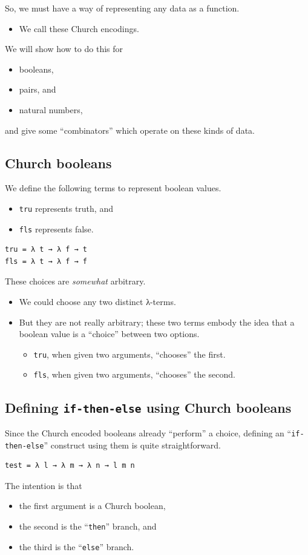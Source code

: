 \documentclass[11pt]{article}
\theoremstyle{definition}
\begin{document}
So, we must have a way of representing any data as
a function.
\begin{itemize}
\item We call these Church encodings.
\end{itemize}

We will show how to do this for
\begin{itemize}
\item booleans,
\item pairs, and
\item natural numbers,
\end{itemize}
and give some “combinators” which operate on these kinds of data.

\subsection{Church booleans}
\label{sec:orgdc36ca5}

We define the following terms to represent boolean values.
\begin{itemize}
\item \texttt{tru} represents truth, and
\item \texttt{fls} represents false.
\end{itemize}
\begin{verbatim}
tru = λ t → λ f → t
fls = λ t → λ f → f
\end{verbatim}

These choices are \emph{somewhat} arbitrary.
\begin{itemize}
\item We could choose any two distinct λ-terms.
\item But they are not really arbitrary;
these two terms embody the idea that a boolean value
is a “choice” between two options.
\begin{itemize}
\item \texttt{tru}, when given two arguments, “chooses” the first.
\item \texttt{fls}, when given two arguments, “chooses” the second.
\end{itemize}
\end{itemize}

\subsection{Defining \texttt{if-then-else} using Church booleans}
\label{sec:org5be900c}

Since the Church encoded booleans already “perform” a choice,
defining an “\texttt{if-then-else}” construct
using them is quite straightforward.
\begin{verbatim}
test = λ l → λ m → λ n → l m n
\end{verbatim}
The intention is that
\begin{itemize}
\item the first argument is a Church boolean,
\item the second is the “\texttt{then}” branch, and
\item the third is the “\texttt{else}” branch.
\end{itemize}
\end{document}
